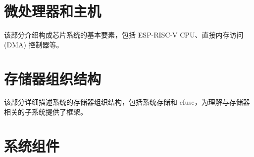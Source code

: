 \documentclass[openany, 10pt]{book}
\begin{document}
\setchineseformatting




\clearpage

\clearpage


\tableofcontents
\clearpage
\listoftables
\clearpage
\listoffigures





\part{微处理器和主机}


该部分介绍构成芯片系统的基本要素，包括 ESP-RISC-V CPU、直接内存访问 (DMA) 控制器等。



\part{存储器组织结构}

该部分详细描述系统的存储器组织结构，包括系统存储和 efuse，为理解与存储器相关的子系统提供了框架。




\part{系统组件}
\end{document}
